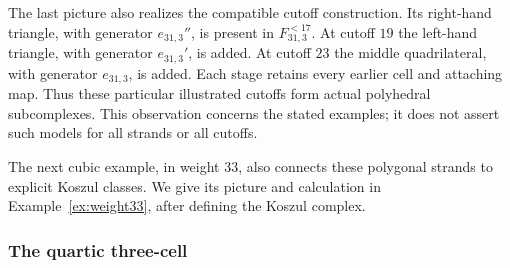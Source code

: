 The last picture also realizes the compatible cutoff construction.
Its right-hand triangle, with generator $e_{31,3}''$, is present in
$F_{31,3}^{<17}$. At cutoff $19$ the left-hand triangle, with generator
$e_{31,3}'$, is added. At cutoff $23$ the middle quadrilateral, with generator
$e_{31,3}$, is added. Each stage retains every earlier cell and
attaching map. Thus these particular illustrated cutoffs form actual
polyhedral subcomplexes. This observation concerns the stated examples;
it does not assert such models for all strands or all cutoffs.

The next cubic example, in weight $33$, also connects these
polygonal strands to explicit Koszul classes. We give its picture
and calculation in Example~\ref{ex:weight33}, after defining the
Koszul complex.

\subsubsection{The quartic three-cell}
